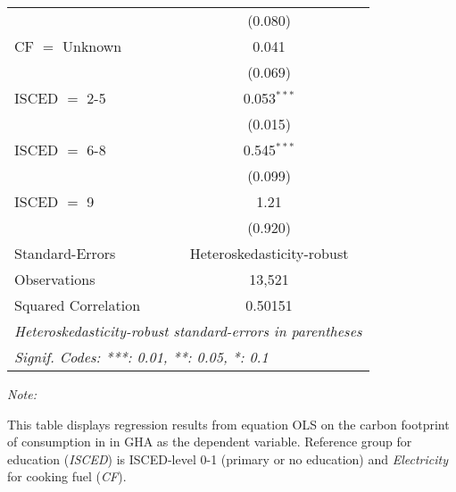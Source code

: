 \begin{table}[htbp!]
\begin{adjustbox}{width = 1\textwidth, max height = 0.95\textheight, center}
\begin{threeparttable}[b]
\begin{tabular}{lc}
                                & (0.080)\\   
            CF $=$ Unknown      & 0.041\\   
                                & (0.069)\\   
            ISCED $=$ 2-5       & 0.053$^{***}$\\   
                                & (0.015)\\   
            ISCED $=$ 6-8       & 0.545$^{***}$\\   
                                & (0.099)\\   
            ISCED $=$ 9         & 1.21\\   
                                & (0.920)\\   
            \midrule 
            Standard-Errors     & Heteroskedasticity-robust \\   
            Observations        & 13,521\\  
            Squared Correlation & 0.50151\\  
            \midrule \midrule
            \multicolumn{2}{l}{\emph{Heteroskedasticity-robust standard-errors in parentheses}}\\
            \multicolumn{2}{l}{\emph{Signif. Codes: ***: 0.01, **: 0.05, *: 0.1}}\\
         \end{tabular}
         
         \begin{tablenotes}\item \medskip \textit{Note:}
            \item This table displays regression results from equation OLS on the carbon footprint of consumption in  in GHA as the dependent variable.  Reference group for education (\textit{ISCED}) is ISCED-level 0-1 (primary or no education) and \textit{Electricity} for cooking fuel (\textit{CF}).
         \end{tablenotes}
      \end{threeparttable}
   \end{adjustbox}
\end{table}


